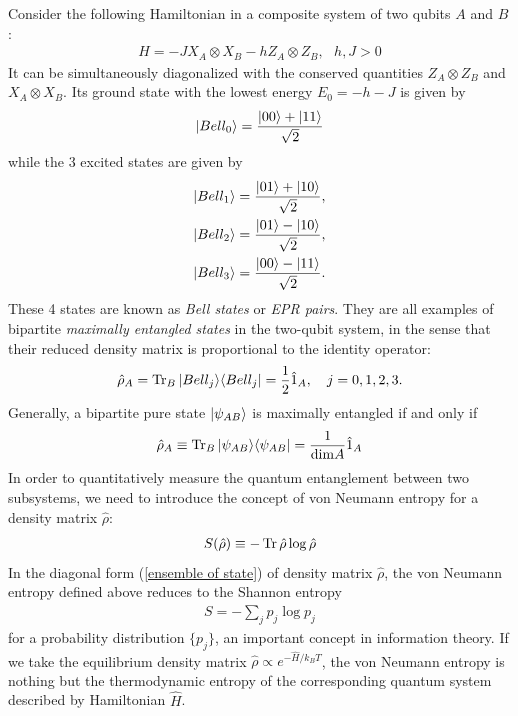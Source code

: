 Consider the following Hamiltonian in a composite system of two qubits $A$ and $B$:
\begin{align}
H=-JX_A\otimes X_B-hZ_A\otimes Z_B,~~~h,J>0
\end{align}
It can be simultaneously diagonalized with the conserved quantities $Z_A\otimes Z_B$ and $X_A\otimes X_B$. Its ground state with the lowest energy $E_0=-h-J$ is given by
\begin{align}
|{Bell_0}\rangle=\frac{|{00}\rangle+|{11}\rangle}{\sqrt2}
\end{align}
while the 3 excited states are given by
\begin{align}
&|{Bell_1}\rangle=\frac{|{01}\rangle+|{10}\rangle}{\sqrt2},\\
&|{Bell_2}\rangle=\frac{|{01}\rangle-|{10}\rangle}{\sqrt2},\\
&|{Bell_3}\rangle=\frac{|{00}\rangle-|{11}\rangle}{\sqrt2}.
\end{align}
These 4 states are known as \emph{Bell states} or \emph{EPR pairs}. They are all examples of bipartite \emph{maximally entangled states} in the two-qubit system, in the sense that their reduced density matrix is proportional to the identity operator:
\begin{align}
\hat\rho_A=\operatorname{Tr}_B|{Bell_j}\rangle\langle{Bell_j}|=\frac12\hat 1_A,~~~j=0,1,2,3.
\end{align}
Generally, a bipartite pure state $|{\psi_{AB}}\rangle$ is maximally entangled if and only if
\begin{align}\label{maximally entangled state}
\hat\rho_A\equiv\operatorname{Tr}_B|{\psi_{AB}}\rangle\langle{\psi_{AB}}|=\frac1{\text{dim} A}\hat 1_A
\end{align}
In order to quantitatively measure the quantum entanglement between two subsystems, we need to introduce the concept of von Neumann entropy for a density matrix $\hat\rho$:
\begin{align}
S(\hat\rho)\equiv-\operatorname{Tr}\hat\rho\log\hat\rho
\end{align}
In the diagonal form (\ref{ensemble of state}) of density matrix $\hat\rho$, the von Neumann entropy defined above reduces to the Shannon entropy 
\begin{align}
S=-\sum_jp_j\log p_j
\end{align}
for a probability distribution $\{p_j\}$, an important concept in information theory. If we take the equilibrium density matrix $\hat\rho\propto e^{-\hat H/k_BT}$, the von Neumann entropy is nothing but the thermodynamic entropy of the corresponding quantum system described by Hamiltonian $\hat H$. 

